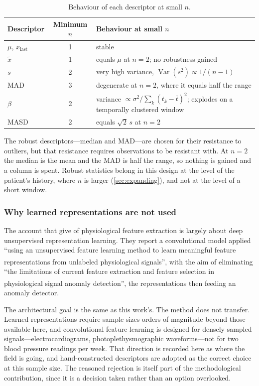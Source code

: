 \documentclass[12pt,a4paper,oneside]{report}
\newcommand{\bq}[1]{``#1''\textsuperscript{\dag}}
\begin{document}
\begin{table}[htbp]
\centering\small
\caption{Behaviour of each descriptor at small $n$.}\label{tab:small-sample}
\begin{tabularx}{\textwidth}{@{}>{\raggedright\arraybackslash}p{3.0cm} c X@{}}
\toprule
\textbf{Descriptor} & \textbf{Minimum $n$} & \textbf{Behaviour at small $n$} \\
\midrule
$\mu$, $x_{\text{last}}$ & 1 & stable \\
$\tilde{x}$ & 1 & equals $\mu$ at $n=2$; no robustness gained \\
$s$ & 2 & very high variance, $\operatorname{Var}(s^2) \propto 1/(n-1)$ \\
MAD & 3 & degenerate at $n=2$, where it equals half the range \\
$\beta$ & 2 & variance $\propto \sigma^2/\sum_k(t_k-\bar t)^2$; explodes on a temporally clustered window \\
MASD & 2 & equals $\sqrt{2}\,s$ at $n=2$ \\
\bottomrule
\end{tabularx}
\end{table}

The robust descriptors---median and MAD---are chosen for their resistance to outliers, but that resistance requires observations to be resistant with. At $n = 2$ the median is the mean and the MAD is half the range, so nothing is gained and a column is spent. Robust statistics belong in this design at the level of the patient's history, where $n$ is larger (\cref{sec:expanding}), and not at the level of a short window.

\subsubsection{Why learned representations are not used}

The account that \textcite{liu2025review} give of physiological feature extraction is largely about deep unsupervised representation learning. They report a convolutional model applied \bq{using an unsupervised feature learning method to learn meaningful feature representations from unlabeled physiological signals}, with the aim of eliminating \bq{the limitations of current feature extraction and feature selection in physiological signal anomaly detection}, the representations then feeding an anomaly detector.

The architectural goal is the same as this work's. The method does not transfer. Learned representations require sample sizes orders of magnitude beyond those available here, and convolutional feature learning is designed for densely sampled signals---electrocardiograms, photoplethysmographic waveforms---not for two blood pressure readings per week. That direction is recorded here as where the field is going, and hand-constructed descriptors are adopted as the correct choice at this sample size. The reasoned rejection is itself part of the methodological contribution, since it is a decision taken rather than an option overlooked.
\end{document}
